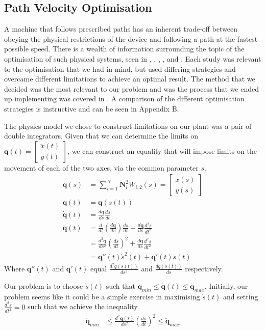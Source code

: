 \subsection{Path Velocity Optimisation}
A machine that follows prescribed paths has an inherent trade-off between obeying the physical restrictions of the device and following a path at the fastest possible speed. There is a wealth of information surrounding the topic of the optimisation of such physical systems, seen in \cite{Bardine10},  \cite{Chen07}, \cite{Choi01}, \cite{Tseng09}, \cite{Schutter09} and \cite{Yeh99}. Each study was relevant to the optimisation that we had in mind, but used differing strategies and overcame different limitations to achieve an optimal result. The method that we decided was the most relevant to our problem and was the process that we ended up implementing was covered in \cite{Schutter09}. A comparison of the different optimisation strategies is instructive and can be seen in Appendix B.

The physics model we chose to construct limitations on our plant was a pair of double integrators. Given that we can determine the limits on $\ddot{\textbf{q}}(t)  = \begin{bmatrix}
\ddot{x}(t)\\
\ddot{y}(t)
\end{bmatrix}$, we can construct an equality that will impose limits on the movement of each of the two axes, via the common parameter $s$.
\begin{align*}
\textbf{q}(s) &= \sum^N_{i=1}\textbf{N}^2_iW_{i,2}(s) = \begin{bmatrix}
x(s)\\
y(s)
\end{bmatrix}\\
\textbf{q}(t) &= \textbf{q}\left(s(t)\right)\\
\dot{\textbf{q}}(t) &= \frac{d\textbf{q}}{ds} \frac{ds}{dt}\\
\ddot{\textbf{q}}(t) &= \frac{d}{dt}\left(\frac{d\textbf{q}}{ds}\right)\frac{ds}{dt} +  \frac{d\textbf{q}}{ds}\frac{d^2s}{dt^2}\\
 &= \frac{d^2\textbf{q}}{ds^2}\left(\frac{ds}{dt}\right)^2 +  \frac{d\textbf{q}}{ds}\frac{d^2s}{dt^2}\\
 &= \textbf{q}''(t)\dot{s}^2(t) + \textbf{q}'(t)\ddot{s}(t)
\end{align*}
Where $\textbf{q}''(t)$ and $\textbf{q}'(t)$ equal $\frac{d^2q(s(t))}{ds^2}$ and $\frac{dq(s(t))}{ds}$ respectively.

Our problem is to choose $\dot{s}(t)$ such that $\ddot{\textbf{q}}_{min} \leq \ddot{\textbf{q}}(t) \leq \ddot{\textbf{q}}_{max}$.
Initially, our problem seems like it could be a simple exercise in maximising $\dot{s}(t)$ and setting $\frac{d^2s}{dt^2} = 0$ such that we achieve the inequality
\begin{align*}
\ddot{\textbf{q}}_{min}& \leq \frac{d^2\textbf{q}(s)}{ds^2}\left(\frac{ds}{dt}\right)^2 \leq \ddot{\textbf{q}}_{max}
\end{align*}

